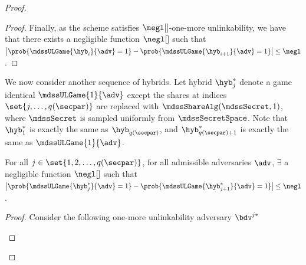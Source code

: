 \begin{proof}
\begin{proof}
		Finally, as the scheme satisfies $\negl[]$-one-more unlinkability, we have that there exists a negligible function $\negl[]$ such that
		$\left| \prob{\mdssULGame{\hyb_i}{\adv} =1} - \prob{\mdssULGame{\hyb_{i + 1}}{\adv} = 1} \right| \leq \negl$.
	\end{proof}

	We now consider another sequence of hybrids.
	Let hybrid $\hyb_j^*$ denote a game identical $\mdssULGame{1}{\adv}$ except the shares at indices $\set{j, \dots, q(\secpar)}$ are replaced with $\mdssShareAlg(\mdssSecret, 1)$, where $\mdssSecret$ is sampled uniformly from $\mdssSecretSpace$.
	Note that $\hyb_1^*$ is exactly the same as $\hyb_{q(\secpar)}$, and $\hyb_{q(\secpar) + 1}^*$ is exactly the same as $\mdssULGame{1}{\adv}$.

	\begin{claim}
		For all $j \in \set{1, 2, \dots, q(\secpar)}$, for all admissible adversaries $\adv$, $\exists$ a negligible function $\negl[]$ such that $\left| \prob{\mdssULGame{\hyb^*_j}{\adv} = 1} - \prob{\mdssULGame{\hyb_{j+1}^*}{\adv} = 1} \right| \leq \negl$.
	\end{claim}

	\begin{proof}

		Consider the following one-more unlinkability adversary $\bdv^{j*}$
		\begin{pcvstack}[center, space=1em]


\end{pcvstack}
\end{proof}
\end{proof}
